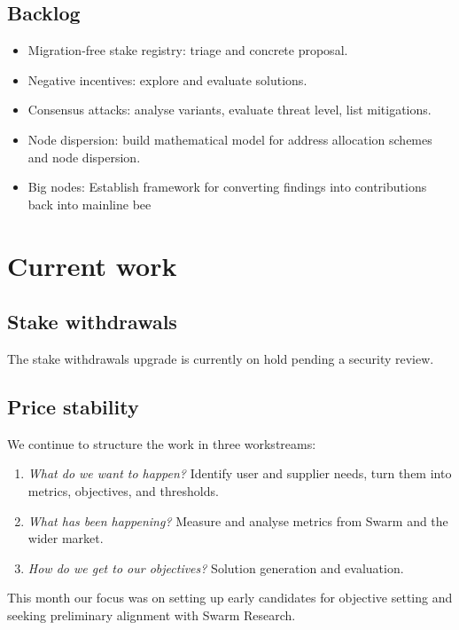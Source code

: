 \subsection*{Backlog}
\begin{itemize}
  \item Migration-free stake registry: triage and concrete proposal.
  \item Negative incentives: explore and evaluate solutions.
  \item Consensus attacks: analyse variants, evaluate threat level, list mitigations.
  \item Node dispersion: build mathematical model for address allocation schemes and node dispersion.
  \item Big nodes: Establish framework for converting findings into contributions back into mainline bee
\end{itemize}


\section*{Current work}

\subsection*{Stake withdrawals}

The stake withdrawals upgrade is currently on hold pending a security review.

\subsection*{Price stability}
%
We continue to structure the work in three workstreams:
\begin{enumerate}
  \item \emph{What do we want to happen?} Identify user and supplier needs, turn them into metrics, objectives, and thresholds.
  \item \emph{What has been happening?} Measure and analyse metrics from Swarm and the wider market.
  \item \emph{How do we get to our objectives?} Solution generation and evaluation.
\end{enumerate}
%
This month our focus was on setting up early candidates for objective setting and seeking preliminary alignment with Swarm Research.

